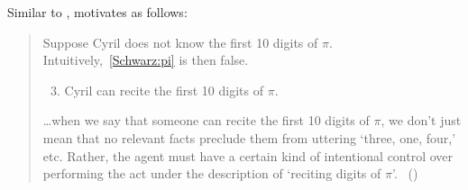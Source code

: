 \begin{note}
  Similar to \citeauthor{Mandelkern:2017aa}, \textcite{Schwarz:2020aa} motivates \AbControl{} as follows:

  \begin{quote}
    Suppose Cyril does not know the first 10 digits of \(\pi\).
    Intuitively,~\ref{Schwarz:pi} is then false.

    \begin{enumerate}[label=(\arabic*), ref=(\arabic*)]
      \setcounter{enumi}{2}
    \item
      \label{Schwarz:pi}
      Cyril can recite the first 10 digits of \(\pi\).
    \end{enumerate}

    \dots when we say that someone can recite the first 10 digits of \(\pi\), we don't just mean that no relevant facts preclude them from uttering `three, one, four,' etc.
    Rather, the agent must have a certain kind of intentional control over performing the act under the description of `reciting digits of \(\pi\)'.%
    \mbox{ }\hfill\mbox{(\citeyear[2]{Schwarz:2020aa})}
  \end{quote}
\end{note}

